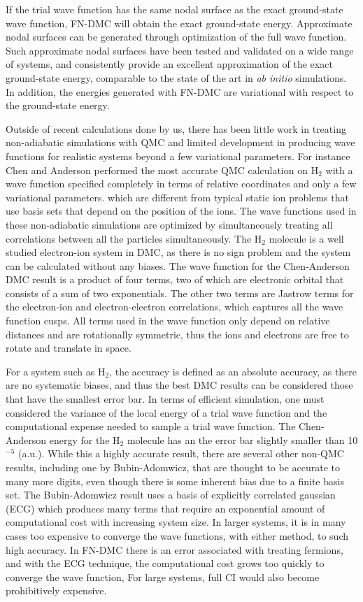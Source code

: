 \documentclass[aip,jcp,numerical,reprint]{revtex4-1}
\begin{document}
If the trial wave function has the same nodal surface as the exact ground-state wave function, FN-DMC will obtain the exact ground-state energy.  Approximate nodal surfaces can be generated through optimization of the full wave function. Such approximate nodal surfaces have been tested and validated on a wide range of systems, and consistently provide an excellent approximation of the exact ground-state energy, comparable to the state of the art in \textit{ab initio} simulations.~\cite{grossman1} In addition, the energies generated with FN-DMC are variational with respect to the ground-state energy.


Outside of recent calculations done by us, there has been little work in treating non-adiabatic simulations with QMC and limited development in producing wave functions for realistic systems beyond a few variational parameters.  For instance Chen and Anderson \cite{anderson1} performed the most accurate QMC calculation on  H$_{2}$ with a wave function  specified completely in terms of relative coordinates and only a few variational parameters. which are different from typical static ion problems that use basis sets that depend on the position of the ions.   The wave functions used in these non-adiabatic simulations are optimized by simultaneously treating all correlations between all the particles simultaneously.
The  H$_{2}$ molecule is a well studied electron-ion system in DMC, as there is no sign problem and the system can be calculated without any biases. The wave function for the Chen-Anderson DMC result  is a product of four terms, two of which are electronic orbital that consists of a sum of two exponentials.  The  other two terms are Jastrow terms for the electron-ion and electron-electron correlations, which captures all the wave function cusps.  All terms used in the wave function only depend on relative distances and are rotationally symmetric, thus the ions and electrons are free to rotate and translate in space.  

For a system such as H$_{2}$, the accuracy is defined as an absolute accuracy, as there are no systematic biases, and thus the best DMC results can be considered those that have the smallest error bar.  In terms of efficient simulation, one must considered the variance of the local energy of a trial wave function and the computational expense needed to sample a trial wave function.  The Chen-Anderson energy for the H$_{2}$ molecule has an the error bar slightly smaller than 10$^{-5}$ (a.u.).  While this a highly accurate result, there are several other non-QMC results, including one by Bubin-Adomwicz, that are thought to be accurate to many more digits, even though there is some inherent bias due to a finite basis set.  The Bubin-Adomwicz result uses a basis of explicitly correlated gaussian (ECG) which produces many terms that require an exponential amount of computational cost with increasing system size. 
In larger systems, it is in many cases too expensive to converge the wave functions, with either method, to such high accuracy.  In FN-DMC there is an error associated with treating fermions, and with the ECG technique, the computational cost grows too quickly to converge the wave function, For large systems, full CI would also become prohibitively expensive.  
\end{document}

